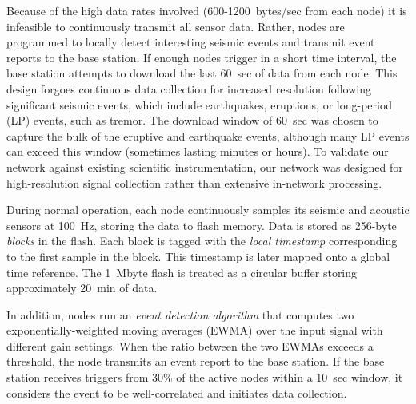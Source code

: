 Because of the high data rates involved (600-1200~bytes/sec from each node)
it is infeasible to continuously transmit all sensor data. Rather, nodes are
programmed to locally detect interesting seismic events and transmit event
reports to the base station. If enough nodes trigger in a short time
interval, the base station attempts to download the last 60~sec of data from
each node.  This design forgoes continuous data collection for increased
resolution following significant seismic events, which include earthquakes,
eruptions, or long-period (LP) events, such as tremor.  The download window
of 60~sec was chosen to capture the bulk of the eruptive and earthquake
events, although many LP events can exceed this window (sometimes lasting
minutes or hours).  To validate our network against existing scientific
instrumentation, our network was designed for high-resolution signal
collection rather than extensive in-network processing.

During normal operation, each node continuously samples its seismic and
acoustic sensors at 100~Hz, storing the data to flash memory. Data is stored
as 256-byte {\em blocks} in the flash.
Each block 
is tagged with the {\em local timestamp} corresponding to the first sample in
the block.  This timestamp is later mapped onto a global time reference.
The 1~Mbyte flash is treated as a circular buffer storing approximately
20~min of data. 

In addition, nodes run an {\em event detection algorithm} that computes two
exponentially-weighted moving averages (EWMA) over the input signal with
different gain settings. When the ratio between the two EWMAs exceeds a
threshold, the node transmits an event report to the base station.
If the base station receives triggers from 30\% of the active nodes within a
10~sec window, it considers the event to be well-correlated and initiates
data collection.

